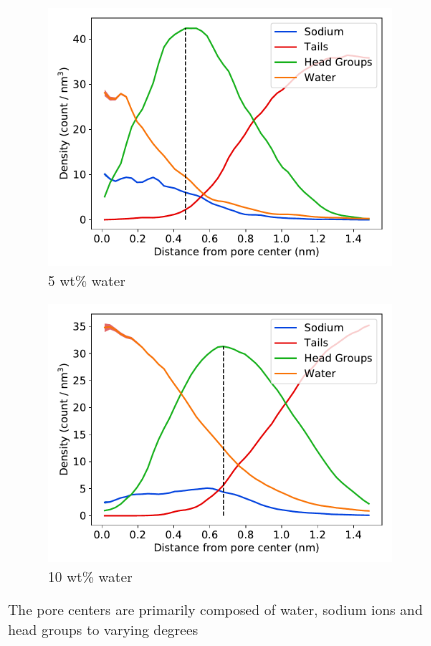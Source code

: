 \documentclass{article}
\begin{document}
  \begin{figure}
  \vspace{-0.5cm}
  \centering
  \begin{subfigure}{0.49\linewidth}
  \includegraphics[width=\linewidth]{component_density_5wt.pdf}
  \caption{5 wt\% water}\label{fig:component_density_5wt}
  \end{subfigure}
  \begin{subfigure}{0.49\linewidth}
  \includegraphics[width=\linewidth]{component_density_10wt.pdf}
  \caption{10 wt\% water}\label{fig:component_density_10wt}
  \end{subfigure}
  \caption{The pore centers are primarily 
  composed of water, sodium ions and head groups to varying degrees
}
\end{figure}
\end{document}
